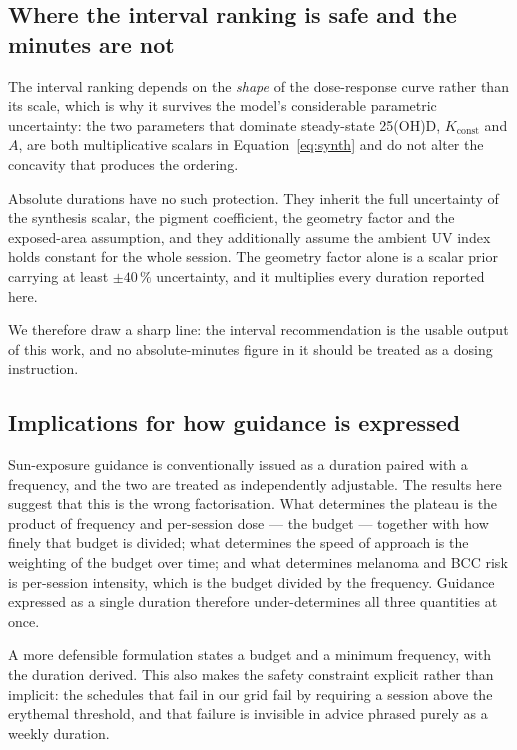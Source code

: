 \documentclass[11pt]{article}
\begin{document}
\subsection{Where the interval ranking is safe and the minutes are not}

The interval ranking depends on the \emph{shape} of the dose-response
curve rather than its scale, which is why it survives the model's
considerable parametric uncertainty: the two parameters that dominate
steady-state 25(OH)D, $K_{\mathrm{const}}$ and $A$, are both
multiplicative scalars in Equation~\eqref{eq:synth} and do not alter
the concavity that produces the ordering.

Absolute durations have no such protection. They inherit the full
uncertainty of the synthesis scalar, the pigment coefficient, the
geometry factor and the exposed-area assumption, and they additionally
assume the ambient UV index holds constant for the whole session. The
geometry factor alone is a scalar prior carrying at least $\pm40\,\%$
uncertainty, and it multiplies every duration reported here.

We therefore draw a sharp line: the interval recommendation is the
usable output of this work, and no absolute-minutes figure in it
should be treated as a dosing instruction.

\subsection{Implications for how guidance is expressed}

Sun-exposure guidance is conventionally issued as a duration paired
with a frequency, and the two are treated as independently
adjustable. The results here suggest that this is the wrong
factorisation. What determines the plateau is the product of frequency
and per-session dose --- the budget --- together with how finely that
budget is divided; what determines the speed of approach is the
weighting of the budget over time; and what determines melanoma and
BCC risk is per-session intensity, which is the budget divided by the
frequency. Guidance expressed as a single duration therefore
under-determines all three quantities at once.

A more defensible formulation states a budget and a minimum
frequency, with the duration derived. This also makes the safety
constraint explicit rather than implicit: the schedules that fail in
our grid fail by requiring a session above the erythemal threshold,
and that failure is invisible in advice phrased purely as a weekly
duration.
\end{document}
